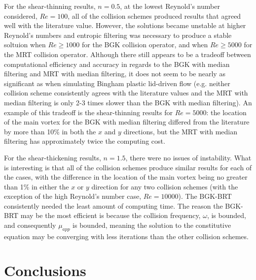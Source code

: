 For the shear-thinning results, $n = 0.5$, at the lowest Reynold's number considered, $Re = 100$, all of the collision schemes produced results that agreed well with the literature value.
However, the solutions became unstable at higher Reynold's numbers and entropic filtering was necessary to produce a stable soltuion when $Re \ge 1000$ for the BGK collision operator, and when $Re \ge 5000$ for the MRT collision operator.
Although there still appears to be a tradeoff between computational efficiency and accuracy in regards to the BGK with median filtering and MRT with median filtering, it does not seem to be nearly as significant as when simulating Bingham plastic lid-driven flow (e.g. neither collision scheme consistently agrees with the literature values and the MRT with median filtering is only 2-3 times slower than the BGK with median filtering).
An example of this tradeoff is the shear-thinning results for $Re = 5000$: the location of the main vortex for the BGK with median filtering differed from the literature by more than 10\% in both the $x$ and $y$ directions, but the MRT with median filtering has approximately twice the computing cost.

For the shear-thickening results, $n = 1.5$, there were no issues of instability.
What is interesting is that all of the collision schemes produce similar results for each of the cases, with the difference in the location of the main vortex being no greater than 1\% in either the $x$ or $y$ direction for any two collision schemes (with the exception of the high Reynold's number case, $Re = 10000$).
The BGK-BRT consistently needed the least amount of computing time.
The reason the BGK-BRT may be the most efficient is because the collision frequency, $\omega$, is bounded, and consequently $\mu_{app}$ is bounded, meaning the solution to the constitutive equation may be converging with less iterations than the other collision schemes.

\section{Conclusions} \label{sec:numerical-study-conclusions}


